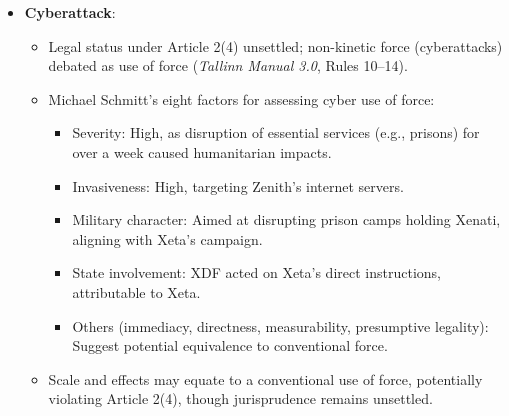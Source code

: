 \begin{itemize}
\begin{itemize}
    \end{itemize}
    \item \textbf{Cyberattack}:
    \begin{itemize}
        \item Legal status under Article 2(4) unsettled; non-kinetic force (cyberattacks) debated as use of force (\textit{Tallinn Manual 3.0}, Rules 10–14).
        \item Michael Schmitt’s eight factors for assessing cyber use of force:
        \begin{itemize}
            \item Severity: High, as disruption of essential services (e.g., prisons) for over a week caused humanitarian impacts.
            \item Invasiveness: High, targeting Zenith’s internet servers.
            \item Military character: Aimed at disrupting prison camps holding Xenati, aligning with Xeta’s campaign.
            \item State involvement: XDF acted on Xeta’s direct instructions, attributable to Xeta.
            \item Others (immediacy, directness, measurability, presumptive legality): Suggest potential equivalence to conventional force.
        \end{itemize}
        \item Scale and effects may equate to a conventional use of force, potentially violating Article 2(4), though jurisprudence remains unsettled.
    \end{itemize}
\end{itemize}

